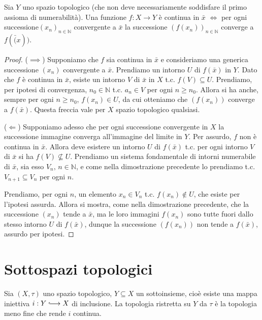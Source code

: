 \documentclass{article}
\begin{document}
\begin{prop}
	Sia $Y$ uno spazio topologico (che non deve necessariamente soddisfare il
	primo assioma di numerabilità). Una funzione $f:X \rightarrow Y$ è continua
	in $\bar{x}$ $\Leftrightarrow$ per ogni successione$(x_n)_{n \in
	\mathbb{N}}$ convergente a $\bar{x}$ la successione $(f(x_n))_{n \in
	\mathbb{N}}$ converge a $f(\bar(x))$.
\end{prop}

\begin{proof}
	($\implies$) Supponiamo che $f$ sia continua in $\bar{x}$ e consideriamo una
	generica successione $(x_n)$ convergente a $\bar{x}$. Prendiamo un intorno
	$U$ di $f(\bar{x})$ in $Y$. Dato che $f$ è continua in $\bar{x}$, esiste un
	intorno $V$ di $\bar{x}$ in $X$ t.c. $f(V) \subseteq U$. Prendiamo, per
	ipotesi di convergenza, $n_0 \in \mathbb{N}$ t.c. $a_n \in V$ per ogni $n
	\ge n_0$. Allora si ha anche, sempre per ogni $n \ge n_0$, $f(x_n) \in U$,
	da cui otteniamo che $(f(x_n))$ converge a $f(\bar{x})$. Questa freccia vale
	per $X$ spazio topologico qualsiasi.

	($\Leftarrow$) Supponiamo adesso che per ogni successione convergente in $X$
	la successione immagine converga all'immagine del limite in $Y$. Per
	assurdo, $f$ non è continua in $\bar{x}$. Allora deve esistere un intorno
	$U$ di $f(\bar{x})$ t.c. per ogni intorno $V$ di $\bar{x}$ si ha $f(V) \not
	\subseteq U$. Prendiamo un sistema fondamentale di intorni numerabile di
	$\bar{x}$, sia esso $V_n, \, n \in \mathbb{N}$, e come nella dimostrazione
	precedente lo prendiamo t.c. $V_{n+1} \subseteq V_n$ per ogni $n$.

	Prendiamo, per ogni $n$, un elemento $x_n \in V_n$ t.c. $f(x_n) \not\in U$,
	che esiste per l'ipotesi assurda. Allora si mostra, come nella dimostrazione
	precedente, che la successione $(x_n)$ tende a $\bar{x}$, ma le loro
	immagini $f(x_n)$ sono tutte fuori dallo stesso intorno $U$ di $f(\bar{x})$,
	dunque la successione $(f(x_n))$ non tende a $f(\bar{x})$, assurdo per
	ipotesi.
\end{proof}

\section{Sottospazi topologici}

\begin{defn}
    Sia $(X, \tau)$ uno spazio topologico, $Y \subseteq X$ un sottoinsieme,
    cio\`e esiste una mappa iniettiva $i: Y \hooklongrightarrow X$ di
    inclusione. La topologia ristretta su $Y$ da $\tau$ \`e la topologia meno
    fine che rende $i$ continua.
\end{defn}
\end{document}

